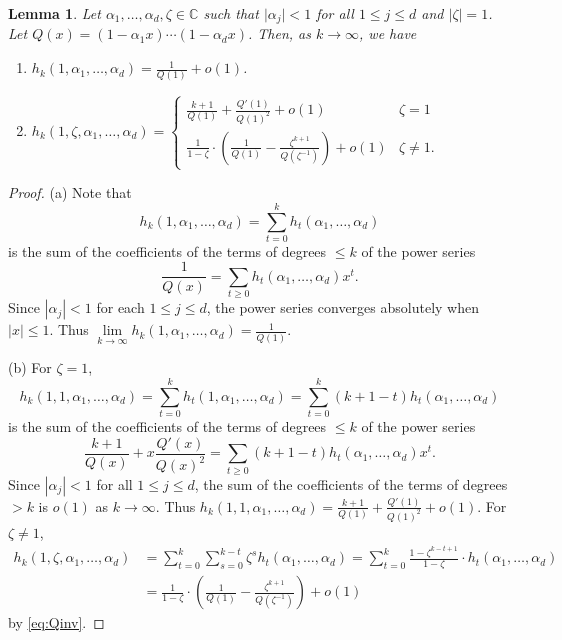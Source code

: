 \documentclass[12pt,centertags,oneside]{amsart}
\newtheorem{lemma}[theorem]{Lemma}
\theoremstyle{definition}
\newcommand{\CC}{\mathbb{C}}
\begin{document}
\begin{lemma}\label{lem}
Let $\alpha_1,\dots,\alpha_d,\zeta\in \CC$ such that $\lvert \alpha_j\rvert 
<1$ for all $1\leqslant j\leqslant d$ and $\lvert \zeta\rvert = 1$. Let 
$Q(x)=(1-\alpha_1 x)\dotsm (1-\alpha_d x)$. Then, as $k\to \infty$, we have 
\begin{enumerate}
\item[(a)] $h_k(1,\alpha_1,\dots,\alpha_d)=\frac{1}{Q(1)}+o(1)$.
\item[(b)] 
    $h_k(1,\zeta,\alpha_1,\dots,\alpha_d)
    =\begin{cases}\frac{k+1}{Q(1)}+\frac{Q'(1)}{Q(1)^2}+o(1)&\zeta=1\\
    \frac{1}{1-\zeta}\cdot\left(\frac{1}{Q(1)}-\frac{\zeta^{k+1}}{Q(\zeta^{-1})}\right)+o(1)&\zeta\neq 
    1.\end{cases}$
\end{enumerate}
\end{lemma}

\begin{proof}
(a) Note that
\[
h_k(1,\alpha_1,\dots,\alpha_d)=\sum\limits_{t=0}^k 
h_t(\alpha_1,\dots,\alpha_d)
\]
is the sum of the coefficients of the terms of degrees $\leqslant k$ of the 
power series
\begin{equation}\label{eq:Qinv} 
\frac{1}{Q(x)}=\sum\limits_{t\geqslant 0} h_t(\alpha_1,\dots,\alpha_d)x^t.
\end{equation}
Since $|\alpha_j|< 1$ for each $1\leqslant j\leqslant d$, the power series 
converges absolutely when $|x|\leqslant 1$. Thus $\lim\limits_{k\to \infty} 
h_k(1,\alpha_1,\dots,\alpha_d)=\frac{1}{Q(1)}$. 

(b) For $\zeta=1$, 
\[
h_k(1,1,\alpha_1,\dots,\alpha_d)=
\sum\limits_{t=0}^k h_t(1,\alpha_1,\dots,\alpha_d)
=
\sum\limits_{t=0}^{k}(k+1-t)h_t(\alpha_1,\dots,\alpha_d)
\]
is the sum of the coefficients of the terms of degrees $\leqslant k$ of the power 
series
\[
\frac{k+1}{Q(x)}+x\frac{Q'(x)}{Q(x)^2}
=
\sum\limits_{t\geqslant 0}(k+1-t)h_t(\alpha_1,\dots,\alpha_d)x^t.
\]
Since $|\alpha_j|< 1$ for all $1\leqslant j\leqslant d$, the sum of the 
coefficients of the terms of degrees $>k$ is $o(1)$ as $k\to \infty$.  Thus 
$h_k(1,1,\alpha_1,\dots,\alpha_d)=\frac{k+1}{Q(1)}+\frac{Q'(1)}{Q(1)^2}+o(1)$. 
For $\zeta\neq 1$, 
\begin{align*}
h_k(1,\zeta,\alpha_1,\dots,\alpha_d)&=\sum_{t=0}^k \sum_{s=0}^{k-t}\zeta^{s}h_t(\alpha_1,\dots,\alpha_d)=\sum_{t=0}^k\frac{1-\zeta^{k-t+1}}{1-\zeta}\cdot h_t(\alpha_1,\dots,\alpha_d)\\
&=\frac{1}{1-\zeta}\cdot\left(\frac{1}{Q(1)}-\frac{\zeta^{k+1}}{Q(\zeta^{-1})}\right)+o(1)
\end{align*}
by \eqref{eq:Qinv}.
\end{proof}
\end{document}
